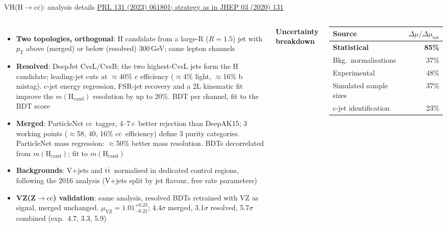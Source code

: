 \documentclass[aspectratio=169,10pt,xcolor=table]{beamer}
\newcommand{\qbar}[1]{\mathrm{#1}\overline{\mathrm{#1}}}
\newcommand{\ccbar}{\ensuremath{\qbar{c}}}
\newcommand{\Hcc}{\ensuremath{\mathrm{H}\to\qbar{c}}}
\newcommand{\ttbar}{\ensuremath{\qbar{t}}}
\newcommand{\pubref}[2]{{\hfill\scriptsize\href{#2}{\color{cmsblue}#1}}}
\newcommand{\pubHIG}[1]{https://cms-results.web.cern.ch/cms-results/public-results/publications/#1/}
\begin{document}
\begin{frame}{VH(\Hcc): analysis details}
  \pubref{PRL 131 (2023) 061801; strategy as in JHEP 03 (2020) 131}{\pubHIG{HIG-21-008}}
  \begin{columns}[T]
    \begin{itemize}\scriptsize
      \item \textbf{Two topologies, orthogonal}: H candidate from a large-R ($R=1.5$) jet with $p_\mathrm{T}$ above (merged) or below (resolved) 300\,GeV; same lepton channels
      \item \textbf{Resolved}: DeepJet CvsL/CvsB; the two highest-CvsL jets form the H candidate; leading-jet cuts at $\approx$40\% c efficiency ($\approx$4\% light, $\approx$16\% b mistag). c-jet energy regression, FSR-jet recovery and a 2L kinematic fit improve the $m(\mathrm{H_{cand}})$ resolution by up to 20\%. BDT per channel, fit to the BDT score
      \item \textbf{Merged}: ParticleNet \ccbar\ tagger, 4--7$\times$ better rejection than DeepAK15; 3 working points ($\approx$58, 40, 16\% \ccbar\ efficiency) define 3 purity categories. ParticleNet mass regression: $\approx$50\% better mass resolution. BDTs decorrelated from $m(\mathrm{H_{cand}})$; fit to $m(\mathrm{H_{cand}})$
      \item \textbf{Backgrounds}: V+jets and \ttbar\ normalised in dedicated control regions, following the 2016 analysis (V+jets split by jet flavour, free rate parameters)
      \item \textbf{VZ(Z$\to\ccbar$) validation}: same analysis, resolved BDTs retrained with VZ as signal, merged unchanged. $\mu_\mathrm{VZ} = 1.01^{+0.23}_{-0.21}$; 4.4$\sigma$ merged, 3.1$\sigma$ resolved, 5.7$\sigma$ combined (exp.\ 4.7, 3.3, 5.9)
    \end{itemize}
    \centering
    {\small\bfseries\color{cmsblue}Uncertainty breakdown}\\[0.3ex]
    \scriptsize
    \renewcommand{\arraystretch}{1.1}
    \begin{tabular}{lr}
      \toprule
      Source & $\Delta\mu/\Delta\mu_\mathrm{tot}$\\
      \midrule
      \textbf{Statistical} & \textbf{85\%}\\
      \quad Bkg.\ normalisations & 37\%\\
      Experimental & 48\%\\
      \quad Simulated sample sizes & 37\%\\
      \quad c-jet identification & 23\%\\

\end{tabular}
\end{columns}
\end{frame}
\end{document}
